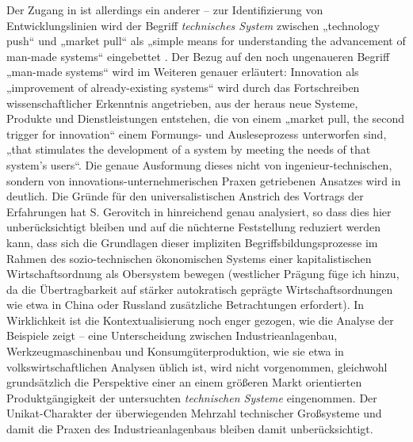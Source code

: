 \documentclass[11pt,a4paper]{article}
\begin{document}
Der Zugang in \cite{TESE2018} ist allerdings ein anderer -- zur
Identifizierung von Entwicklungslinien wird der Begriff \emph{technisches
  System} zwischen „technology push“ und „market pull“ als „simple means for
understanding the advancement of man-made systems“ eingebettet
\cite[S. 1]{TESE2018}. Der Bezug auf den noch ungenaueren Begriff „man-made
systems“ wird im Weiteren genauer erläutert: Innovation als „improvement of
already-existing systems“ wird durch das Fortschreiben wissenschaftlicher
Erkenntnis angetrieben, aus der heraus neue Systeme, Produkte und
Dienstleistungen entstehen, die von einem „market pull, the second trigger for
innovation“ einem Formungs- und Ausleseprozess unterworfen sind, „that
stimulates the development of a system by meeting the needs of that system's
users“.  Die genaue Ausformung dieses nicht von ingenieur-technischen, sondern
von innovations-unternehmerischen Praxen getriebenen Ansatzes wird in
\cite[Kap. 3]{TESE2018} deutlich.  Die Gründe für den universalistischen
Anstrich des Vortrags der Erfahrungen hat S. Gerovitch in \cite{Gerovitch1996}
hinreichend genau analysiert, so dass dies hier unberücksichtigt bleiben und
auf die nüchterne Feststellung reduziert werden kann, dass sich die Grundlagen
dieser impliziten Begriffsbildungsprozesse im Rahmen des sozio-technischen
ökonomischen Systems einer kapitalistischen Wirtschaftsordnung als Obersystem
bewegen (westlicher Prägung füge ich hinzu, da die Übertragbarkeit auf stärker
autokratisch geprägte Wirtschaftsordnungen wie etwa in China oder Russland
zusätzliche Betrachtungen erfordert).  In Wirklichkeit ist die
Kontextualisierung noch enger gezogen, wie die Analyse der Beispiele zeigt --
eine Unterscheidung zwischen Industrieanlagenbau, Werkzeugmaschinenbau und
Konsumgüterproduktion, wie sie etwa in volkswirtschaftlichen Analysen üblich
ist, wird nicht vorgenommen, gleichwohl grundsätzlich die Perspektive einer an
einem größeren Markt orientierten Produktgängigkeit der untersuchten
\emph{technischen Systeme} eingenommen.  Der Unikat-Charakter der
überwiegenden Mehrzahl technischer Großsysteme und damit die Praxen des
Industrieanlagenbaus bleiben damit unberücksichtigt.
\end{document}
